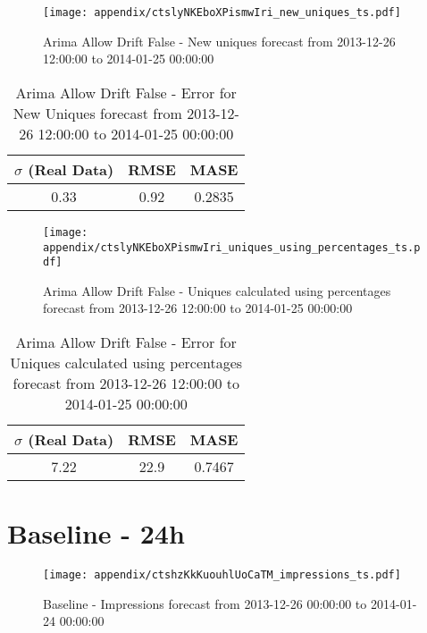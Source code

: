 \begin{figure}[H] \begin{center} \leavevmode
\texttt{[image: appendix/ctslyNKEboXPismwIri\_new\_uniques\_ts.pdf]} \caption[]{
Arima Allow Drift False - New uniques forecast from 2013-12-26 12:00:00 to 2014-01-25 00:00:00} \label{fig:appendix/ctslyNKEboXPismwIri_new_uniques_ts.pdf} \end{center}
\end{figure}

\begin{table}[H]
\centering
\footnotesize
\begin{tabular}{ccc}
$\sigma$ (Real Data) & RMSE & MASE   \\ \hline
0.33 & 0.92 & 0.2835 \\
\end{tabular}

\vspace{0.5cm}

\caption[]{
Arima Allow Drift False - Error for New Uniques forecast from 2013-12-26 12:00:00 to 2014-01-25 00:00:00}
\end{table}

\begin{figure}[H] \begin{center} \leavevmode
\texttt{[image: appendix/ctslyNKEboXPismwIri\_uniques\_using\_percentages\_ts.pdf]} \caption[]{
Arima Allow Drift False - Uniques calculated using percentages forecast from 2013-12-26 12:00:00 to 2014-01-25 00:00:00} \label{fig:appendix/ctslyNKEboXPismwIri_uniques_using_percentages_ts.pdf} \end{center}
\end{figure}

\begin{table}[H]
\centering
\footnotesize
\begin{tabular}{ccc}
$\sigma$ (Real Data) & RMSE & MASE   \\ \hline
7.22 & 22.9 & 0.7467 \\
\end{tabular}

\vspace{0.5cm}

\caption[]{
Arima Allow Drift False - Error for Uniques calculated using percentages forecast from 2013-12-26 12:00:00 to 2014-01-25 00:00:00}
\end{table}

\section{Baseline - 24h}
\begin{figure}[H] \begin{center} \leavevmode
\texttt{[image: appendix/ctshzKkKuouhlUoCaTM\_impressions\_ts.pdf]} \caption[]{
Baseline - Impressions forecast from 2013-12-26 00:00:00 to 2014-01-24 00:00:00} \label{fig:appendix/ctshzKkKuouhlUoCaTM_impressions_ts.pdf} \end{center}
\end{figure}

